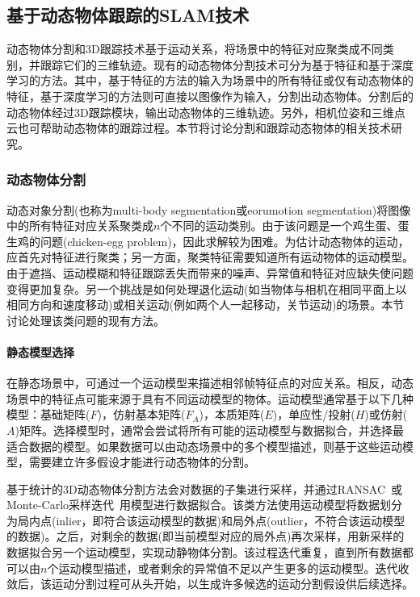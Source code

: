 \subsection{基于动态物体跟踪的SLAM技术}
\label{subsec:object_tracking}
动态物体分割和3D跟踪技术基于运动关系，将场景中的特征对应聚类成不同类别，并跟踪它们的三维轨迹。现有的动态物体分割技术可分为基于特征和基于深度学习的方法。其中，基于特征的方法的输入为场景中的所有特征或仅有动态物体的特征，基于深度学习的方法则可直接以图像作为输入，分割出动态物体。分割后的动态物体经过3D跟踪模块，输出动态物体的三维轨迹。另外，相机位姿和三维点云也可帮助动态物体的跟踪过程。本节将讨论分割和跟踪动态物体的相关技术研究。

\subsubsection{动态物体分割}
动态对象分割(也称为multi-body segmentation或eorumotion segmentation)将图像中的所有特征对应关系聚类成$n$个不同的运动类别。由于该问题是一个鸡生蛋、蛋生鸡的问题(chicken-egg problem)，因此求解较为困难。为估计动态物体的运动，应首先对特征进行聚类；另一方面，聚类特征需要知道所有运动物体的运动模型。由于遮挡、运动模糊和特征跟踪丢失而带来的噪声、异常值和特征对应缺失使问题变得更加复杂。另一个挑战是如何处理退化运动(如当物体与相机在相同平面上以相同方向和速度移动)或相关运动(例如两个人一起移动，关节运动)的场景。本节讨论处理该类问题的现有方法。

\paragraph{静态模型选择}
在静态场景中，可通过一个运动模型来描述相邻帧特征点的对应关系。相反，动态场景中的特征点可能来源于具有不同运动模型的物体。运动模型通常基于以下几种模型：基础矩阵($F$)，仿射基本矩阵($F_A$)，本质矩阵($E$)，单应性/投射($H$)或仿射($A$)矩阵。选择模型时，通常会尝试将所有可能的运动模型与数据拟合，并选择最适合数据的模型。如果数据可以由动态场景中的多个模型描述，则基于这些运动模型，需要建立许多假设才能进行动态物体的分割。

基于统计的3D动态物体分割方法会对数据的子集进行采样，并通过RANSAC~\cite{fischler1981randomA}或Monte-Carlo采样迭代~\cite{schindler2006two}用模型进行数据拟合。该类方法使用运动模型将数据划分为局内点(inlier，即符合该运动模型的数据)和局外点(outlier，不符合该运动模型的数据)。之后，对剩余的数据(即当前模型对应的局外点)再次采样，用新采样的数据拟合另一个运动模型，实现动静物体分割。该过程迭代重复，直到所有数据都可以由$n$个运动模型描述，或者剩余的异常值不足以产生更多的运动模型。迭代收敛后，该运动分割过程可从头开始，以生成许多候选的运动分割假设供后续选择。

